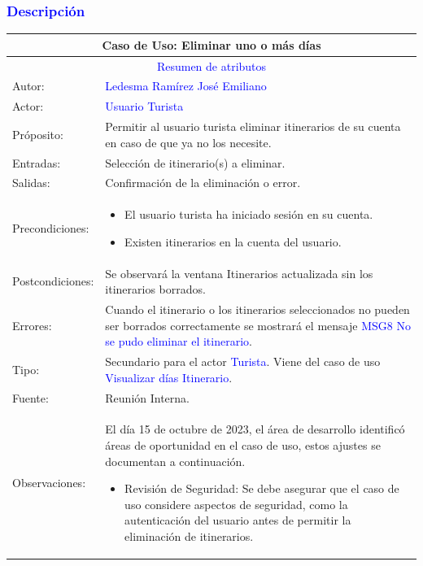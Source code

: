 \subsubsection{\textcolor{blue}{Descripción}}
\begin{tabularx}{16cm}{||l|X||}
	\hline
	\multicolumn{2}{||c||}{\textbf{Caso de Uso: Eliminar uno o más días}} \\
	\hline
	\multicolumn{2}{||c||}{\textcolor{blue}{Resumen de atributos}} \\
 \hline
	{Autor:} & {\textcolor{blue}{Ledesma Ramírez José Emiliano}} \\
	\hline
	\hline
	{Actor:} & {\textcolor{blue}{Usuario Turista}} \\
	\hline
	{Próposito:} & Permitir al usuario turista eliminar itinerarios de su cuenta en caso de que ya no los necesite.\\
	\hline
	{Entradas:} & Selección de itinerario(s) a eliminar.
        \\
	\hline
	{Salidas:} & Confirmación de la eliminación o error.\\
	\hline
	{Precondiciones:} & 
        \begin{itemize}
            \item El usuario turista ha iniciado sesión en su cuenta.
            \item Existen itinerarios en la cuenta del usuario.
        \end{itemize}\\ 
	\hline
	{Postcondiciones:} & Se observará la ventana Itinerarios actualizada sin los itinerarios borrados.\\
	\hline
	{Errores:} & Cuando el itinerario o los itinerarios seleccionados no pueden ser borrados correctamente se mostrará el mensaje {\textcolor{blue}{MSG8 No se pudo eliminar el itinerario}}. \\
	\hline
	{Tipo:} & Secundario para el actor {\textcolor{blue}{Turista}}. Viene del caso de uso {\textcolor{blue}{Visualizar días Itinerario}}.\\
	\hline
	{Fuente:} & Reunión Interna. \\
	\hline
	{Observaciones:} & El día 15 de octubre de 2023, el área de desarrollo identificó áreas de oportunidad en el caso de uso, estos ajustes se documentan a continuación.
    \begin{itemize}
        \item Revisión de Seguridad: Se debe asegurar que el caso de uso considere aspectos de seguridad, como la autenticación del usuario antes de permitir la eliminación de itinerarios. 

\end{itemize}
\end{tabularx}
